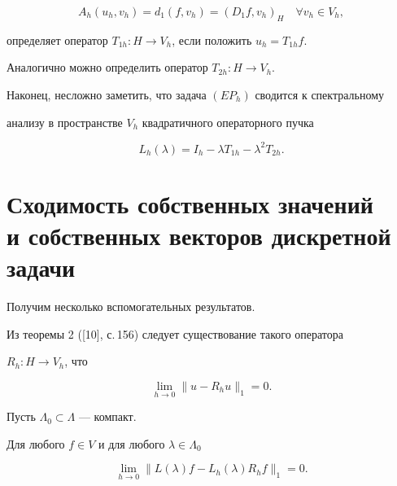 $$


A_h(u_h,v_h)=d_1(f,v_h)=(D_1 f,v_h)_H\quad \forall v_h \in V_h,


$$


определяет оператор $T_{1h}:H\to V_h$, если положить $u_h=T_{1h}f$.


Аналогично можно определить оператор $T_{2h}:H\to V_h$.


\medskip





Наконец, несложно заметить, что задача $(EP_h)$ сводится к спектральному


анализу в пространстве $V_h$ квадратичного операторного пучка


\begin{equation}


L_h(\lambda)=I_h-\lambda T_{1h}-\lambda^2 T_{2h}.


\end{equation}





\section{ Сходимость собственных значений\protect\\


и собственных векторов дискретной задачи}





Получим несколько вспомогательных результатов.


Из теоремы 2 ([10], с.\,156) следует существование такого оператора


$R_h:H\to V_h$, что


\begin{equation}


\lim_{h\to 0}\|u-R_h u\|_1=0.


\end{equation}





Пусть $\Lambda_0\subset \Lambda$ --- компакт.





\begin{lems} Для любого $f\in V$ и для любого $\lambda\in \Lambda_0$


\begin{equation}


\lim_{h\to 0}\|L(\lambda)f-L_h(\lambda)R_h f\|_1=0.


\end{equation}


\end{lems}





